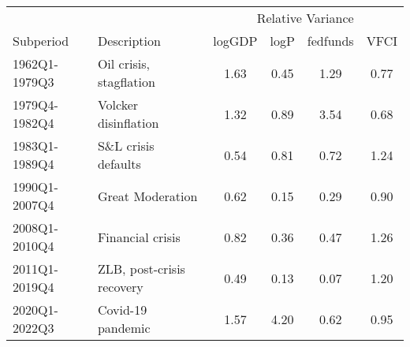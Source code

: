 \begingroup
\fontsize{12.0pt}{14.4pt}\selectfont
\begin{tabular}{llcccc}
\toprule
 &  & \multicolumn{4}{c}{Relative Variance} \\ 
\cmidrule(lr){3-6}
Subperiod & Description & logGDP & logP & fedfunds & VFCI \\ 
\midrule\addlinespace[2.5pt]
1962Q1-1979Q3 & Oil crisis, stagflation & 1.63 & 0.45 & 1.29 & 0.77 \\ 
1979Q4-1982Q4 & Volcker disinflation & 1.32 & 0.89 & 3.54 & 0.68 \\ 
1983Q1-1989Q4 & S\&L crisis defaults & 0.54 & 0.81 & 0.72 & 1.24 \\ 
1990Q1-2007Q4 & Great Moderation & 0.62 & 0.15 & 0.29 & 0.90 \\ 
2008Q1-2010Q4 & Financial crisis & 0.82 & 0.36 & 0.47 & 1.26 \\ 
2011Q1-2019Q4 & ZLB, post-crisis recovery & 0.49 & 0.13 & 0.07 & 1.20 \\ 
2020Q1-2022Q3 & Covid-19 pandemic & 1.57 & 4.20 & 0.62 & 0.95 \\ 
\bottomrule
\end{tabular}
\endgroup

